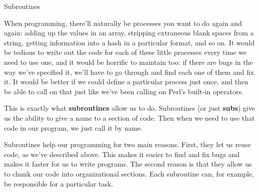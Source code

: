 \documentclass[a4paper,11pt]{book}
\begin{document}

\noindent 

\noindent 

\noindent 

\noindent 

\noindent 

\noindent 

\noindent 

\noindent 

\noindent 

\noindent 

\noindent 

\noindent 

\noindent 

\noindent 

\noindent 

\noindent Subroutines

\noindent 

\noindent 

\noindent 

\noindent 

\noindent When programming, there'll naturally be processes you want to do again and again: adding up the values in an array, stripping extraneous blank spaces from a string, getting information into a hash in a particular format, and so on. It would be tedious to write out the code for each of these little processes every time we need to use one, and it would be horrific to maintain too: if there are bugs in the way we've specified it, we'll have to go through and find each one of them and fix it. It would be better if we could define a particular process just once, and then be able to call on that just like we've been calling on Perl's built-in operators.

\noindent 

\noindent This is exactly what \textbf{subroutines }allow us to do. Subroutines (or just \textbf{subs}) give us the ability to give a name to a section of code. Then when we need to use that code in our program, we just call it by name.

\noindent 

\noindent Subroutines help our programming for two main reasons. First, they let us reuse code, as we've described above. This makes it easier to find and fix bugs and makes it faster for us to write programs. The second reason is that they allow us to chunk our code into organizational sections. Each subroutine can, for example, be responsible for a particular task.
\end{document}

